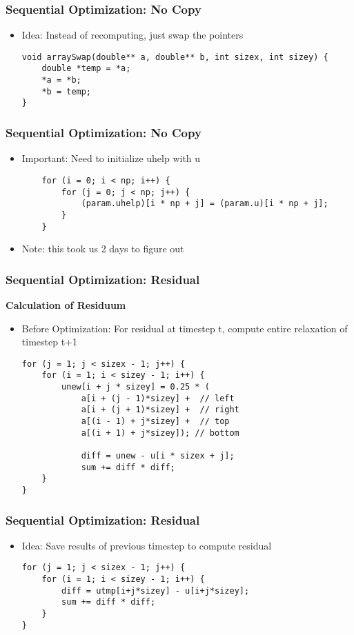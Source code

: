\begin{frame}[fragile]
\frametitle{Sequential Optimization: No Copy}
\begin {itemize}

\item Idea: Instead of recomputing, just swap the pointers
\begin{lstlisting}
void arraySwap(double** a, double** b, int sizex, int sizey) {
	double *temp = *a;
	*a = *b;
	*b = temp;
}
\end{lstlisting}

\end {itemize}
\end{frame}

\begin{frame}[fragile]
\frametitle{Sequential Optimization: No Copy}
\begin {itemize}

\item Important: Need to initialize uhelp with u 
\begin{lstlisting}
	for (i = 0; i < np; i++) {
		for (j = 0; j < np; j++) {
			(param.uhelp)[i * np + j] = (param.u)[i * np + j];
		}
	}
\end{lstlisting}
\item Note: this took us 2 days to figure out

\end {itemize}
\end{frame}

\begin{frame}[fragile]
\frametitle{Sequential Optimization: Residual}

\textbf{Calculation of Residuum}
\begin {itemize}
\item Before Optimization: For residual at timestep t, compute entire relaxation of timestep t+1
\begin{lstlisting}
for (j = 1; j < sizex - 1; j++) {
	for (i = 1; i < sizey - 1; i++) {
		unew[i + j * sizey] = 0.25 * (
			a[i + (j - 1)*sizey] +  // left
			a[i + (j + 1)*sizey] +  // right
			a[(i - 1) + j*sizey] +  // top
			a[(i + 1) + j*sizey]); // bottom
						
			diff = unew - u[i * sizex + j];
			sum += diff * diff;
	}
}
\end{lstlisting}

\end {itemize}
\end{frame}

\begin{frame}[fragile]
\frametitle{Sequential Optimization: Residual}
\begin {itemize}

\item Idea: Save results of previous timestep to compute residual
\begin{lstlisting}
for (j = 1; j < sizex - 1; j++) {
	for (i = 1; i < sizey - 1; i++) {
		diff = utmp[i+j*sizey] - u[i+j*sizey];
		sum += diff * diff;
	}
}
\end{lstlisting}

\end {itemize}
\end{frame}

